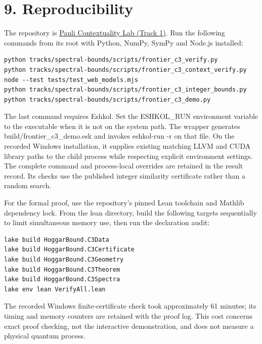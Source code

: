 \documentclass[11pt,letterpaper]{article}
\begin{document}
\section{9. Reproducibility}\label{reproducibility}

The repository is \href{https://github.com/0thernes/pauli-contextuality-lab}{Pauli Contextuality Lab (Track 1)}. Run the following commands from its root with Python, NumPy, SymPy and Node.js installed:

\begin{samepage}\begin{verbatim}
python tracks/spectral-bounds/scripts/frontier_c3_verify.py
python tracks/spectral-bounds/scripts/frontier_c3_context_verify.py
node --test tests/test_web_models.mjs
python tracks/spectral-bounds/scripts/frontier_c3_integer_bounds.py
python tracks/spectral-bounds/scripts/frontier_c3_demo.py
\end{verbatim}\end{samepage}

The last command requires Eshkol. Set the ESHKOL\_RUN environment variable to the executable when it is not on the system path. The wrapper generates build/frontier\_c3\_demo.esk and invokes eshkol-run -r on that file. On the recorded Windows installation, it supplies existing matching LLVM and CUDA library paths to the child process while respecting explicit environment settings. The complete command and process-local overrides are retained in the result record. Its checks use the published integer similarity certificate rather than a random search.

For the formal proof, use the repository's pinned Lean toolchain and Mathlib dependency lock. From the lean directory, build the following targets sequentially to limit simultaneous memory use, then run the declaration audit:

\begin{samepage}\begin{verbatim}
lake build HoggarBound.C3Data
lake build HoggarBound.C3Certificate
lake build HoggarBound.C3Geometry
lake build HoggarBound.C3Theorem
lake build HoggarBound.C3Spectra
lake env lean VerifyAll.lean
\end{verbatim}\end{samepage}

The recorded Windows finite-certificate check took approximately 61 minutes; its timing and memory counters are retained with the proof log. This cost concerns exact proof checking, not the interactive demonstration, and does not measure a physical quantum process.
\end{document}
